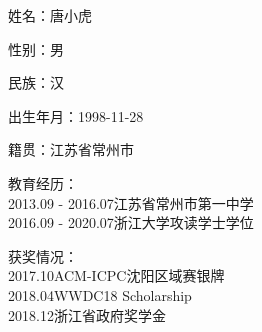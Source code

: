 \cleardoublepage
{}

\noindent 姓名：唐小虎

\noindent 性别：男

\noindent 民族：汉

\noindent 出生年月：1998-11-28

\noindent 籍贯：江苏省常州市

\noindent 教育经历：\\
2013.09 - 2016.07\qquad 江苏省常州市第一中学\\
2016.09 - 2020.07\qquad 浙江大学攻读学士学位

\noindent 获奖情况：\\
2017.10\qquad ACM-ICPC沈阳区域赛银牌\\
2018.04\qquad WWDC18 Scholarship\\
2018.12\qquad 浙江省政府奖学金
